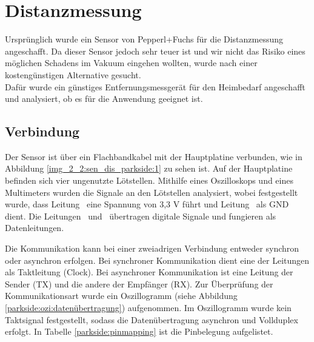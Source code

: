 \section{Distanzmessung}
\label{Distanzmessung}
%
%
%

Ursprünglich wurde ein Sensor von Pepperl+Fuchs für die Distanzmessung angeschafft. Da dieser Sensor jedoch sehr teuer ist und wir nicht das Risiko eines möglichen Schadens im Vakuum eingehen wollten, wurde nach einer kostengünstigen Alternative gesucht.\\
Dafür wurde ein günstiges Entfernungsmessgerät für den Heimbedarf angeschafft und analysiert, ob es für die Anwendung geeignet ist.


\subsection{Verbindung}

Der Sensor ist über ein Flachbandkabel mit der Hauptplatine verbunden, wie in Abbildung \ref{img_2_2:sen_dis_parkside:1} zu sehen ist. Auf der Hauptplatine befinden sich vier ungenutzte Lötstellen. Mithilfe eines Oszilloskops und eines Multimeters wurden die Signale an den Lötstellen analysiert, wobei festgestellt wurde, dass Leitung \flqq\ eine Spannung von 3,3 V führt und Leitung \flqq\ als GND dient. Die Leitungen \flqq\ und \flqq\ übertragen digitale Signale und fungieren als Datenleitungen.

Die Kommunikation kann bei einer zweiadrigen Verbindung entweder synchron oder asynchron erfolgen. Bei synchroner Kommunikation dient eine der Leitungen als Taktleitung (Clock). Bei asynchroner Kommunikation ist eine Leitung der Sender (TX) und die andere der Empfänger (RX). Zur Überprüfung der Kommunikationsart wurde ein Oszillogramm (siehe Abbildung \ref{parkside:ozi:datenübertragung}) aufgenommen. Im Oszillogramm wurde kein Taktsignal festgestellt, sodass die Datenübertragung asynchron und Vollduplex erfolgt. In Tabelle \ref{parkside:pinmapping} ist die Pinbelegung aufgelistet.\\



